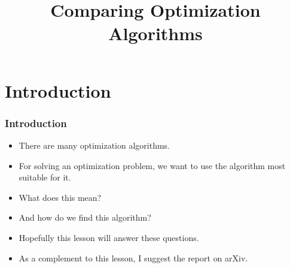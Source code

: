 \documentclass[aspectratio=169,mathserif,notheorems]{beamer}%
\title{Comparing Optimization Algorithms}%
\begin{document}
%
\startPresentation%
%
\section{Introduction}%
%
\begin{frame}%
\frametitle{Introduction}%
\begin{itemize}%
\item There are many optimization algorithms.%
\item<2-> For solving an optimization problem, we want to use the algorithm most suitable for it.%
\item<3-> \alert<3>{What does this mean?}%
\item<4-> \alert<4>{And how do we find this algorithm?}%
\item<5-> Hopefully this lesson will answer these questions.%
\item<6-> As a complement to this lesson, I suggest the report \emph{}\cite{BBDvdBBCEFKLCLIMMNOVWW2020BIOBPAOI} on arXiv.%
\end{itemize}%
\end{frame}%
%
%
\end{document}

